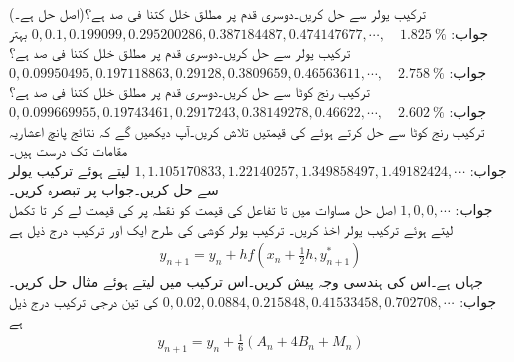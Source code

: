 \quad
ترکیب یولر سے  حل کریں۔دوسری قدم پر مطلق خلل کتنا فی صد ہے؟(اصل حل  ہے۔)\\
جواب:\quad
$0,0.1,0.199099,0.295200286,0.387184487,0.474147677,\cdots, \quad \SI{1.825}{\percent}$
\quad
بہتر ترکیب یولر سے  حل کریں۔دوسری قدم پر مطلق خلل کتنا فی صد ہے؟\\
جواب:\quad
$0,0.09950495,0.197118863,0.29128,0.3809659,0.46563611,\cdots,\quad \SI{2.758}{\percent}$
\quad
ترکیب رنج کوٹا  سے  حل کریں۔دوسری قدم پر مطلق خلل کتنا فی صد ہے؟\\
جواب:\quad
$0,0.099669955,0.19743461,0.2917243,0.38149278,0.46622,\cdots,\quad \SI{2.602}{\percent}$
\quad
ترکیب رنج کوٹا  سے  حل کرتے ہوئے  کی قیمتیں تلاش کریں۔آپ دیکھیں گے کہ نتائج پانچ اعشاریہ مقامات تک درست ہیں۔\\
جواب:\quad
$1,1.105170833,1.22140257,1.349858497,1.49182424,\cdots$
\quad
{} لیتے ہوئے ترکیب یولر سے  حل کریں۔جواب پر تبصرہ کریں۔\\
جواب:\quad
$1,0,0,\cdots$
اصل حل 
\quad
مساوات  میں  تا  تفاعل  کی قیمت کو نقطہ  پر  کی قیمت لے کر  تا  تکمل لیتے ہوئے ترکیب یولر اخذ کریں۔
\quad
ترکیب یولر کوشی کی طرح ایک اور ترکیب درج ذیل ہے
\begin{align*}
y_{n+1}=y_n+hf(x_n+\tfrac{1}{2}h,y^*_{n+1})
\end{align*}
جہاں  ہے۔اس کی ہندسی وجہ پیش کریں۔اس ترکیب میں  لیتے ہوئے مثال  حل کریں۔\\
جواب:\quad
$0,0.02,0.0884,0.215848,0.41533458,0.702708,\cdots$
\quad
{} کی تین درجی ترکیب درج ذیل ہے
\begin{align*}
y_{n+1}=y_n+\tfrac{1}{6}(A_n+4B_n+M_n)
\end{align*}
